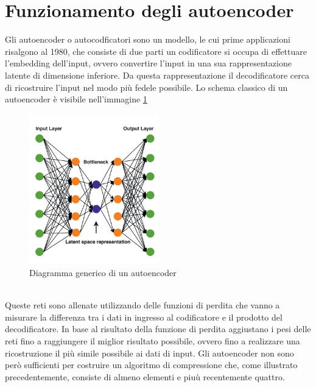 \section{Funzionamento degli autoencoder}
Gli autoencoder o autocodficatori sono un modello, le cui prime applicazioni risalgono al 1980, che consiste di due parti un codificatore si occupa di effettuare l’embedding dell’input, ovvero convertire l’input in una sua rappresentazione latente di dimensione inferiore. Da questa rappresentazione il decodificatore cerca di ricostruire l’input nel modo più fedele possibile. Lo schema classico di un autoencoder è visibile nell’immagine \ref{fig:modelloAutoencoder}\\
\begin{figure}[!h]
    \centering
    \includegraphics[width=0.5\textwidth]{Immagini/Autoencoder_scheme.png}
    \caption{Diagramma generico di un autoencoder}
    \label{fig:modelloAutoencoder}
\end{figure}\\
Queste reti sono allenate utilizzando delle funzioni di perdita che vanno a misurare la differenza tra i dati in ingresso al codificatore e il prodotto del decodificatore. In base al risultato della funzione di perdita aggiustano i pesi delle reti fino a raggiungere il miglior risultato possibile, ovvero fino a realizzare una ricostruzione il più simile possibile ai dati di input.
Gli autoencoder non sono però sufficienti per costruire un algoritmo di compressione che, come illustrato precedentemente, consiste di almeno elementi e piuù recentemente quattro.
\newpage
